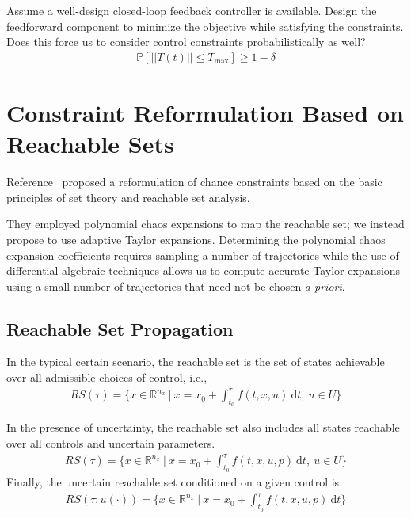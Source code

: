 \documentclass[letterpaper, preprint, paper,11pt]{AAS}	%
\begin{document}
	Assume a well-design closed-loop feedback controller is available. Design the feedforward component to minimize the objective while satisfying the constraints. Does this force us to consider control constraints probabilistically as well?
	\begin{align}
	\mathbb{P}[||T(t)|| \le T_{\max}] \ge 1-\delta
	\end{align}
	

	\section{Constraint Reformulation Based on Reachable Sets}
		Reference~ proposed a reformulation of chance constraints based on the basic principles of set theory and reachable set analysis. 
		
		They employed polynomial chaos expansions to map the reachable set; we instead propose to use adaptive Taylor expansions. Determining the polynomial chaos expansion coefficients requires sampling a number of trajectories while the use of differential-algebraic techniques allows us to compute accurate Taylor expansions using a small number of trajectories that need not be chosen \textit{a priori}. 
		
	\subsection{Reachable Set Propagation}
	In the typical certain scenario, the reachable set is the set of states achievable over all admissible choices of control, i.e.,
\begin{align}
	 RS(\tau) = \lbrace x\in\mathbb{R}^{n_x} \ |\ x = x_0 + \int_{t_0}^{\tau} f(t,x,u)\ \mathrm{d}t,\ u\in U    \rbrace
\end{align}

	 In the presence of uncertainty, the reachable set also includes all states reachable over all controls and uncertain parameters.  
	 \begin{align}
	 RS(\tau) = \lbrace x\in\mathbb{R}^{n_x} \ |\ x = x_0 + \int_{t_0}^{\tau} f(t,x,u,p)\ \mathrm{d}t,\ u\in U    \rbrace
	 \end{align} 
	 Finally, the uncertain reachable set conditioned on a given control is
	 	 \begin{align}
	 	 RS(\tau; u(\cdot)) = \lbrace x\in\mathbb{R}^{n_x} \ |\ x = x_0 + \int_{t_0}^{\tau} f(t,x,u,p)\ \mathrm{d}t \rbrace
	 	 \end{align} 
	 	 
\end{document}
